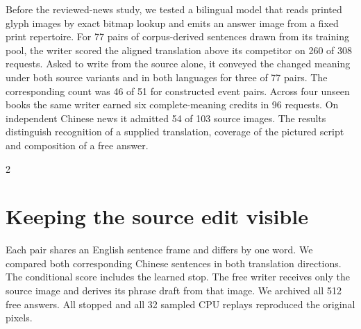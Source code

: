 \noindent Before the reviewed-news study, we tested a bilingual model that reads printed glyph images by exact bitmap lookup and emits an answer image from a fixed print repertoire. For 77 pairs of corpus-derived sentences drawn from its training pool, the writer scored the aligned translation above its competitor on 260 of 308 requests. Asked to write from the source alone, it conveyed the changed meaning under both source variants and in both languages for three of 77 pairs. The corresponding count was 46 of 51 for constructed event pairs. Across four unseen books the same writer earned six complete-meaning credits in 96 requests. On independent Chinese news it admitted 54 of 103 source images. The results distinguish recognition of a supplied translation, coverage of the pictured script and composition of a free answer.\par
\begin{multicols}{2}
\section*{Keeping the source edit visible}
Each pair shares an English sentence frame and differs by one word. We compared both corresponding Chinese sentences in both translation directions. The conditional score includes the learned stop. The free writer receives only the source image and derives its phrase draft from that image. We archived all 512 free answers. All stopped and all 32 sampled CPU replays reproduced the original pixels.
\end{multicols}
